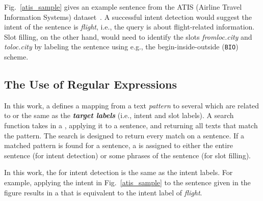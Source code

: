 
 Fig.~\ref{atis_sample} gives an example sentence from the ATIS (Airline Travel Information Systems)
dataset~\cite{hemphill1990atis}. A successful intent detection would suggest the intent of the sentence is \emph{flight}, i.e., the query
is about flight-related information. Slot filling, on the other hand, would need to identify the slots \emph{fromloc.city} and
\emph{toloc.city} by labeling the sentence using e.g., the begin-inside-outside (\texttt{BIO}) scheme.




\subsection{The Use of Regular Expressions}
\label{re_desc}

In this work, a \RE defines a mapping from a text \emph{pattern} to several \textbf{\emph{\REtags}} which are related to or the same as the
\textbf{\emph{target labels}} (i.e., intent and slot labels). A search function takes in a \RE, applying it to a sentence, and returning
all texts that match the pattern. The search is designed to return every match on a sentence. If a matched pattern is found for a sentence,
a \REtag is assigned to either the entire sentence (for intent detection) or some phrases of the sentence (for slot filling).


In this work, the \REtags for intent detection is the same as the intent labels.
For example, applying the intent
\RE in Fig.~\ref{atis_sample} to the sentence given in the figure results in a \REtag that is equivalent to the intent label of
\emph{flight}.



